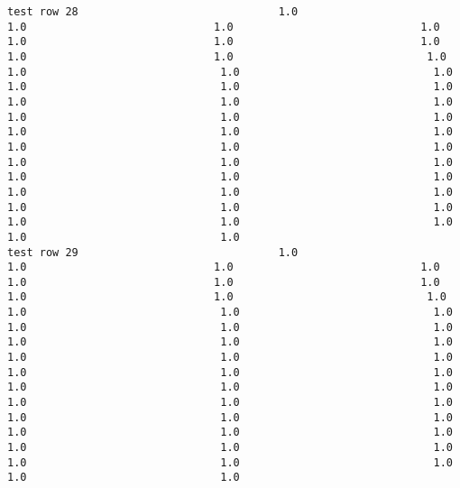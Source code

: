 \documentclass[11pt]{article}
\begin{document}
\begin{verbatim}
test row 28                               1.0                             1.0                             1.0                             1.0                             1.0                             1.0                             1.0                             1.0                             1.0                              1.0                              1.0                              1.0                              1.0                              1.0                              1.0                              1.0                              1.0                              1.0                              1.0                              1.0                              1.0                              1.0                              1.0                              1.0                              1.0                              1.0                              1.0                              1.0                              1.0                              1.0                              1.0                              1.0                              1.0                              1.0                              1.0                              1.0                              1.0                              1.0                              1.0                              1.0                              1.0                              1.0                              1.0                              1.0                              1.0
test row 29                               1.0                             1.0                             1.0                             1.0                             1.0                             1.0                             1.0                             1.0                             1.0                              1.0                              1.0                              1.0                              1.0                              1.0                              1.0                              1.0                              1.0                              1.0                              1.0                              1.0                              1.0                              1.0                              1.0                              1.0                              1.0                              1.0                              1.0                              1.0                              1.0                              1.0                              1.0                              1.0                              1.0                              1.0                              1.0                              1.0                              1.0                              1.0                              1.0                              1.0                              1.0                              1.0                              1.0                              1.0                              1.0

\end{verbatim}
\end{document}
